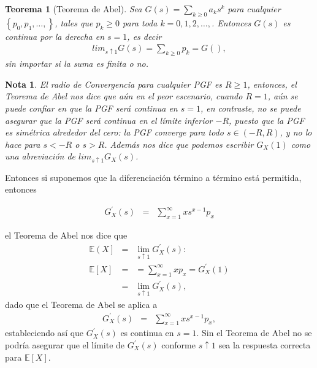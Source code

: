 \documentclass{article}
\newtheorem{Teo}{Teorema}
\newtheorem{Note}{Nota}
\newcommand{\esp}{\mathbb{E}}
\begin{document}
\begin{Teo}[Teorema de Abel]
Sea $G\left(s\right)=\sum_{k\geq0}a_{k}s^{k}$ para cualquier $\left\{p_{0},p_{1},\ldots,\right\}$, tales que $p_{k}\geq0$ para toda $k=0,1,2,\ldots,$. Entonces $G\left(s\right)$ es continua por la derecha en $s=1$, es decir
\begin{eqnarray*}
lim_{s\uparrow1}G\left(s\right)=\sum_{k\geq0}p_{k}=G\left(\right),
\end{eqnarray*}
sin importar si la suma es finita o no.
\end{Teo}
\begin{Note}
El radio de Convergencia para cualquier PGF es $R\geq1$, entonces, el Teorema de Abel nos dice que a\'un en el peor escenario, cuando $R=1$, a\'un se puede confiar en que la PGF ser\'a continua en $s=1$, en contraste, no se puede asegurar que la PGF ser\'a continua en el l\'imite inferior $-R$, puesto que la PGF es sim\'etrica alrededor del cero: la PGF converge para todo $s\in\left(-R,R\right)$, y no lo hace para $s<-R$ o $s>R$. Adem\'as nos dice que podemos escribir $G_{X}\left(1\right)$ como una abreviaci\'on de $lim_{s\uparrow1}G_{X}\left(s\right)$.
\end{Note}

Entonces si suponemos que la diferenciaci\'on t\'ermino a t\'ermino est\'a permitida, entonces

\begin{eqnarray*}
G_{X}^{'}\left(s\right)&=&\sum_{x=1}^{\infty}xs^{x-1}p_{x}
\end{eqnarray*}

el Teorema de Abel nos dice que
\begin{eqnarray*}
\esp\left(X\right]&=&\lim_{s\uparrow1}G_{X}^{'}\left(s\right):\\
\esp\left[X\right]&=&=\sum_{x=1}^{\infty}xp_{x}=G_{X}^{'}\left(1\right)\\
&=&\lim_{s\uparrow1}G_{X}^{'}\left(s\right),
\end{eqnarray*}
dado que el Teorema de Abel se aplica a
\begin{eqnarray*}
G_{X}^{'}\left(s\right)&=&\sum_{x=1}^{\infty}xs^{x-1}p_{x},
\end{eqnarray*}
estableciendo as\'i que $G_{X}^{'}\left(s\right)$ es continua en $s=1$. Sin el Teorema de Abel no se podr\'ia asegurar que el l\'imite de $G_{X}^{'}\left(s\right)$ conforme $s\uparrow1$ sea la respuesta correcta para $\esp\left[X\right]$.
\end{document}
